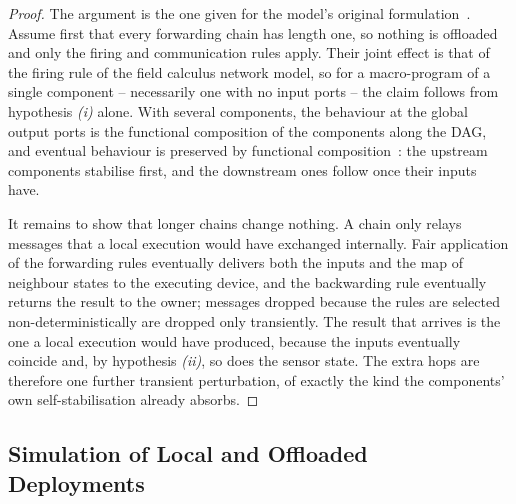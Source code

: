 \begin{proof}
    The argument is the one given for the model's original formulation~\cite{DBLP:conf/acsos/FarabegoliVC24}.
    Assume first that every forwarding chain has length one,
    so nothing is offloaded and only the firing and communication rules apply.
    Their joint effect is that of the firing rule of the field calculus network model,
    so for a macro-program of a single component -- necessarily one with no input ports -- the claim follows from hypothesis \emph{(i)} alone.
    With several components, the behaviour at the global output ports is the functional composition of the components along the \ac{DAG},
    and eventual behaviour is preserved by functional composition~\cite{DBLP:journals/tomacs/ViroliABDP18}:
    the upstream components stabilise first, and the downstream ones follow once their inputs have.

    It remains to show that longer chains change nothing.
    A chain only relays messages that a local execution would have exchanged internally.
    Fair application of the forwarding rules eventually delivers both the inputs and the map of neighbour states to the executing device,
    and the backwarding rule eventually returns the result to the owner;
    messages dropped because the rules are selected non-deterministically are dropped only transiently.
    The result that arrives is the one a local execution would have produced,
    because the inputs eventually coincide and, by hypothesis \emph{(ii)}, so does the sensor state.
    The extra hops are therefore one further transient perturbation,
    of exactly the kind the components' own self-stabilisation already absorbs.
\end{proof}

\subsection{Simulation of Local and Offloaded Deployments}
\label{subsec:pulverization-validation}

